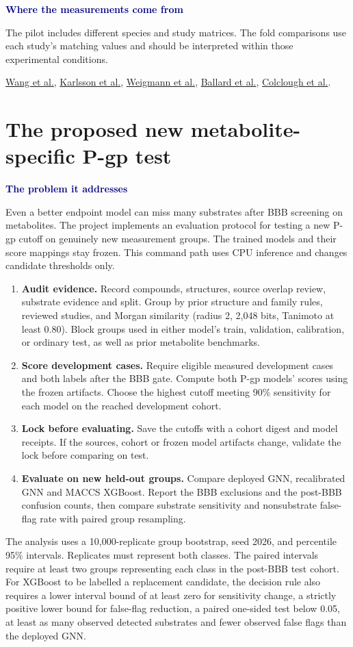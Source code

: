 \documentclass[11pt,a4paper]{article}
\newcommand{\lead}[1]{\par\smallskip\textbf{\textcolor{Navy}{#1}}\par\nobreak}
\newcommand{\pagehead}[1]{\clearpage\section{#1}}
\newcommand{\src}[2]{\href{#1}{#2}}
\begin{document}
\lead{Where the measurements come from}
The pilot includes different species and study matrices. The fold comparisons use each study's matching values and should be interpreted within those experimental conditions.

\src{https://pubmed.ncbi.nlm.nih.gov/15683552/}{Wang et al.},
\src{https://pubmed.ncbi.nlm.nih.gov/20466523/}{Karlsson et al.},
\src{https://pubmed.ncbi.nlm.nih.gov/10208296/}{Weigmann et al.},
\src{https://doi.org/10.1158/1078-0432.CCR-16-0399}{Ballard et al.},
\src{https://doi.org/10.1158/1078-0432.CCR-19-1871}{Colclough et al.}.

\pagehead{The proposed new metabolite-specific P-gp test}\label{sec:prospective}
\lead{The problem it addresses}
Even a better endpoint model can miss many substrates after BBB screening on metabolites. The project implements an evaluation protocol for testing a new P-gp cutoff on genuinely new measurement groups. The trained models and their score mappings stay frozen. This command path uses CPU inference and changes candidate thresholds only.

\begin{enumerate}[leftmargin=*,itemsep=3pt]
\item \textbf{Audit evidence.} Record compounds, structures, source overlap review, substrate evidence and split. Group by prior structure and family rules, reviewed studies, and Morgan similarity (radius 2, 2,048 bits, Tanimoto at least 0.80). Block groups used in either model's train, validation, calibration, or ordinary test, as well as prior metabolite benchmarks.
\item \textbf{Score development cases.} Require eligible measured development cases and both labels after the BBB gate. Compute both P-gp models' scores using the frozen artifacts. Choose the highest cutoff meeting 90\% sensitivity for each model on the reached development cohort.
\item \textbf{Lock before evaluating.} Save the cutoffs with a cohort digest and model receipts. If the sources, cohort or frozen model artifacts change, validate the lock before comparing on test.
\item \textbf{Evaluate on new held-out groups.} Compare deployed GNN, recalibrated GNN and MACCS XGBoost. Report the BBB exclusions and the post-BBB confusion counts, then compare substrate sensitivity and nonsubstrate false-flag rate with paired group resampling.
\end{enumerate}

The analysis uses a 10,000-replicate group bootstrap, seed 2026, and percentile 95\% intervals. Replicates must represent both classes. The paired intervals require at least two groups representing each class in the post-BBB test cohort. For XGBoost to be labelled a replacement candidate, the decision rule also requires a lower interval bound of at least zero for sensitivity change, a strictly positive lower bound for false-flag reduction, a paired one-sided test below 0.05, at least as many observed detected substrates and fewer observed false flags than the deployed GNN.
\end{document}
